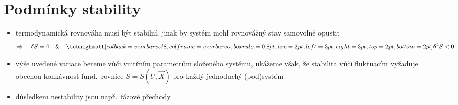 \providecommand{\modre}[1]{\textcolor{NavyBlue}{#1}}
\providecommand{\cervene}[1]{\textcolor{Red}{#1}}
\providecommand{\zelene}[1]{\textcolor{OliveGreen}{#1}}
\providecommand{\dbar}{{\mathchar'26\mkern-12mu d}}

\section{Podmínky stability}
\begin{itemize}
  \item termodynamická rovnováha musí být stabilní, jinak by systém mohl rovnovážný stav samovolně opustit
  \[
    \Rightarrow\quad \delta S = 0 \quad\&\quad \vzorec{\delta^2S < 0}
  \]
  \item výše uvedené variace bereme vůči  vnitřním parametrům složeného systému, ukážeme však, že stabilita vůči fluktuacím vyžaduje obecnou konkávnost fund.\ rovnice $S = S(U,\vec X)$ pro každý jednoduchý (pod)systém
  \item důsledkem nestability jsou např.\ \underline{fázové přechody}
\end{itemize}

